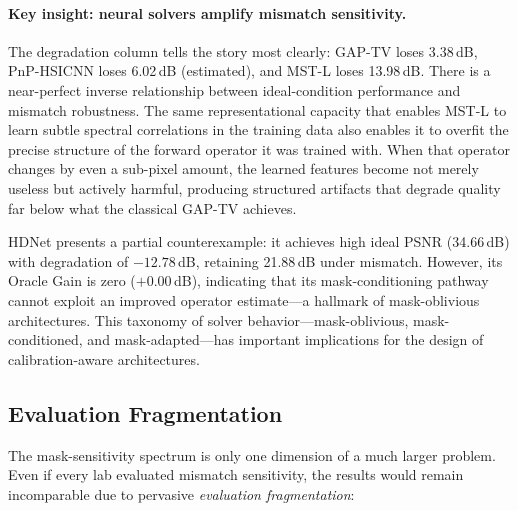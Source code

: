 \paragraph{Key insight: neural solvers amplify mismatch sensitivity.}
The degradation column tells the story most clearly:
GAP-TV loses 3.38\,dB, PnP-HSICNN loses 6.02\,dB (estimated), and MST-L loses
13.98\,dB.
There is a near-perfect inverse relationship between ideal-condition
performance and mismatch robustness.
The same representational capacity that enables MST-L to learn subtle
spectral correlations in the training data also enables it to overfit
the precise structure of the forward operator it was trained with.
When that operator changes by even a sub-pixel amount, the learned features
become not merely useless but actively harmful, producing structured
artifacts that degrade quality far below what the classical GAP-TV achieves.

HDNet presents a partial counterexample: it achieves high ideal PSNR
(34.66\,dB) with degradation of $-12.78$\,dB, retaining
21.88\,dB under mismatch.
However, its Oracle Gain is zero ($+0.00$\,dB), indicating
that its mask-conditioning pathway cannot exploit an improved operator
estimate---a hallmark of mask-oblivious architectures.
This taxonomy of solver behavior---mask-oblivious, mask-conditioned, and
mask-adapted---has important implications for the design of
calibration-aware architectures.


\subsection{Evaluation Fragmentation}
\label{sec:fragmentation}

The mask-sensitivity spectrum is only one dimension of a much larger
problem.
Even if every lab evaluated mismatch sensitivity, the results would
remain incomparable due to pervasive \emph{evaluation fragmentation}:

